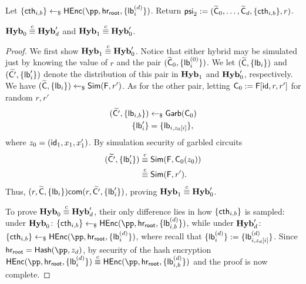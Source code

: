        
       
 Let $\{\cth_{i,b} \} \pick \HEnc(\pp, \hr, \{\lb_{i}^{(d)} \} )$.  Return $\mathsf{psi}_2 := (\widetilde{\mathsf{C}}_0, \dots , \widetilde{\mathsf{C}}_{d} , \{\mathsf{cth}_{i,b} \} , r)$.
 
 \begin{lemma}
$\mathsf{\mathbf{Hyb}}_0 \stackrel{c}{\equiv} \mathsf{\mathbf{Hyb}}'_d  $ and $\mathsf{\mathbf{Hyb}}_1 \stackrel{c}{\equiv} \mathsf{\mathbf{Hyb}}'_0$.
 \end{lemma}
 \begin{proof}
 We first show $\mathsf{\mathbf{Hyb}}_1 \stackrel{c}{\equiv} \mathsf{\mathbf{Hyb}}'_0  $. Notice that either hybrid may be simulated just by knowing the value of $r$ and the pair $(\widetilde{\mathsf{C}}_0, \{\mathsf{lb}_i^{(0)} \})$. We let $(\widetilde{\mathsf{C}} , \{\mathsf{lb}_i \})$ and $(\widetilde{\mathsf{C}'} , \{\mathsf{lb}'_i \})$ denote the distribution of this pair in $\mathsf{\mathbf{Hyb}}_1$ and $\mathsf{\mathbf{Hyb}}'_0$, respectively. We have $(\widetilde{\mathsf{C}} , \{\mathsf{lb}_i \}) \leftarrow_\$ \mathsf{Sim}(\mathsf{F} , r') $. As for the other pair, letting $\mathsf{C}_0 := \mathsf{F}[\mathsf{id}, r , r']$ for random $r, r'$
 \begin{align}
     (\widetilde{\mathsf{C}'} , \{\mathsf{lb}_{i,b} \}) &\leftarrow_\$ \mathsf{Garb}(\mathsf{C}_0) \\
      \{\mathsf{lb}'_i \} &= \{ \mathsf{lb}_{i, z_0[i]}\},
 \end{align}
 where $z_0 = (\mathsf{id}_1, x_1 , x'_1)$.  By simulation security of garbled circuits
 \begin{align}
     (\widetilde{\mathsf{C}'} , \{\mathsf{lb}'_i \} ) &\stackrel{c}{\equiv} \mathsf{Sim}(\mathsf{F} , \mathsf{C}_{0}(z_{0}) ) \label{EQ:label1111A} \\
     &\stackrel{c}{\equiv}  \mathsf{Sim}(\mathsf{F} , r' ). \label{EQ:label12222B}
 \end{align}
Thus, $(r, \widetilde{\mathsf{C}} , \{\mathsf{lb}_i \}) \mathsf{com} (r, \widetilde{\mathsf{C}'} , \{\mathsf{lb}'_i \})$, proving $\mathsf{\mathbf{Hyb}}_1 \stackrel{c}{\equiv} \mathsf{\mathbf{Hyb}}'_0$.

To prove $\mathsf{\mathbf{Hyb}}_0 \stackrel{c}{\equiv} \mathsf{\mathbf{Hyb}}'_d  $, their only difference lies in how $\{ \mathsf{cth}_{i,b}\}$ is sampled: under $\mathsf{\mathbf{Hyb}}_0$: $\{ \cth_{i,b}\} \pick \HEnc(\pp, \hr, \{\lb_{i,b}^{(d)} \} ) $, while under $\mathsf{\mathbf{Hyb}}'_d$: $\{ \cth_{i,b}\} \pick \HEnc(\pp, \hr, \{\lb_{i}^{(d)} \} ) $, where recall that $\{\mathsf{lb}_{i}^{(d)} \} := \{\mathsf{lb}_{i, z_d[i]}^{(d)} \} $. Since $\hr = \Hash(\pp, z_d)$, by security of the hash encryption $\HEnc(\pp, \hr, \{\lb_{i}^{(d)} \} ) \comp \HEnc(\pp, \hr, \{\lb_{i,b}^{(d)} \} ) $ and the proof is now complete.
 \end{proof}
 
